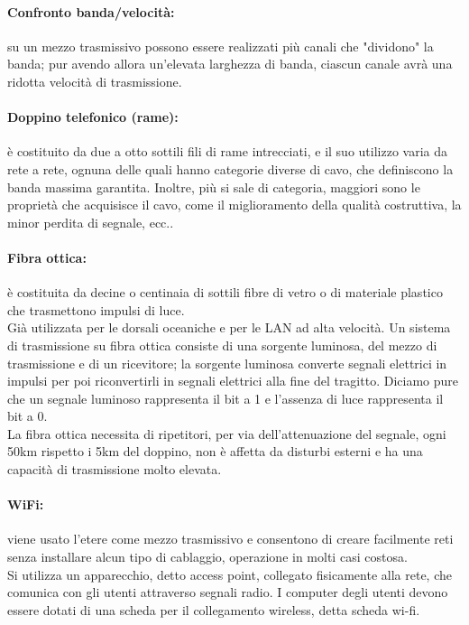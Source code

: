 \documentclass[a4paper]{report}
\begin{document}
\paragraph{Confronto banda/velocità:} su un mezzo trasmissivo possono essere realizzati più canali che "dividono" la banda; pur avendo allora un'elevata larghezza di banda, ciascun canale avrà una ridotta velocità di trasmissione.
\paragraph{Doppino telefonico (rame):} è costituito da due a otto sottili fili di rame intrecciati, e il suo utilizzo varia da rete a rete, ognuna delle quali hanno categorie diverse di cavo, che definiscono la banda massima garantita. Inoltre, più si sale di categoria, maggiori sono le proprietà che acquisisce il cavo, come il miglioramento della qualità costruttiva, la minor perdita di segnale, ecc..
\paragraph{Fibra ottica:} è costituita da decine o centinaia di sottili fibre di vetro o di
materiale plastico che trasmettono impulsi di luce.
\\Già utilizzata per le dorsali oceaniche e per le LAN ad alta
velocità. Un sistema di trasmissione su fibra ottica consiste di una
sorgente luminosa, del mezzo di trasmissione e di un ricevitore; la
sorgente luminosa converte segnali elettrici in impulsi per poi
riconvertirli in segnali elettrici alla fine del tragitto. Diciamo pure
che un segnale luminoso rappresenta il bit a 1 e l'assenza di luce
rappresenta il bit a 0.
\\La fibra ottica necessita di ripetitori, per via dell'attenuazione del
segnale, ogni 50km rispetto i 5km del doppino, non è affetta da
disturbi esterni e ha una capacità di trasmissione molto elevata.
\paragraph{WiFi:} viene usato l'etere come mezzo trasmissivo e
consentono di creare facilmente reti senza
installare alcun tipo di cablaggio, operazione in
molti casi costosa.
\\Si utilizza un apparecchio, detto access point,
collegato fisicamente alla rete, che comunica
con gli utenti attraverso segnali radio. I computer
degli utenti devono essere dotati di una scheda
per il collegamento wireless, detta scheda wi-fi.
\end{document}
